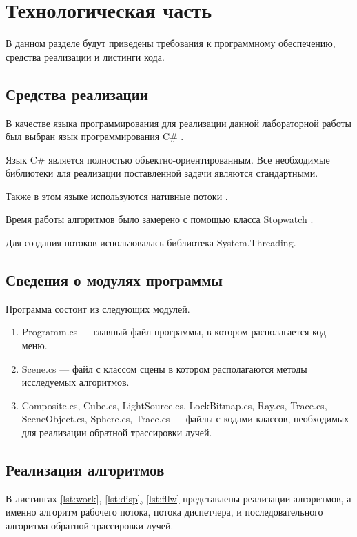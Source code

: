 \chapter{Технологическая часть}

В данном разделе будут приведены требования к программному обеспечению, средства реализации и листинги кода.


\section{Средства реализации}

В качестве языка программирования для реализации данной лабораторной работы был выбран язык программирования C\# \cite{sharplang}. 

Язык C\# является полностью объектно-ориентированным. 
Все необходимые библиотеки для реализации поставленной задачи являются стандартными.

Также в этом языке используются нативные потоки \cite{threads}.

Время работы алгоритмов было замерено с помощью класса Stopwatch \cite{cpplangtime}.

Для создания потоков использовалась библиотека System.Threading. 

\section{Сведения о модулях программы}
Программа состоит из следующих модулей.
\begin{enumerate}
	\item Programm.cs --- главный файл программы, в котором располагается код меню.
	\item Scene.cs --- файл с классом  сцены в котором располагаются методы исследуемых алгоритмов.
	\item Composite.cs, Cube.cs, LightSource.cs, LockBitmap.cs, Ray.cs, Trace.cs, SceneObject.cs, Sphere.cs, Trace.cs  --- файлы с кодами классов, необходимых для реализации обратной трассировки лучей.
\end{enumerate}


\section{Реализация алгоритмов}
В листингах \ref{lst:work}, \ref{lst:disp}, \ref{lst:fllw} представлены реализации алгоритмов, а именно алгоритм рабочего потока, потока диспетчера, и последовательного алгоритма обратной трассировки лучей.

